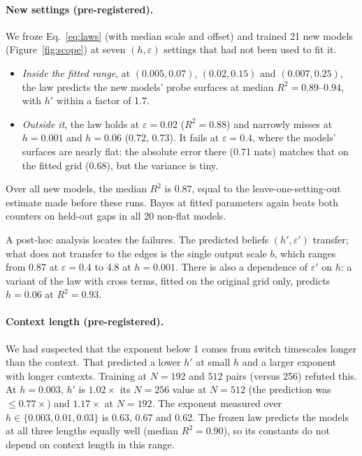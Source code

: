 \documentclass[11pt]{article}
\newcommand{\hp}{h'}
\newcommand{\ep}{\varepsilon'}
\begin{document}
\paragraph{New settings (pre-registered).} We froze Eq.~\eqref{eq:laws} (with median scale and offset) and trained 21 new models (Figure~\ref{fig:scope}) at seven $(h,\varepsilon)$ settings that had not been used to fit it.
\begin{itemize}
\item \emph{Inside the fitted range}, at $(0.005, 0.07)$, $(0.02, 0.15)$ and $(0.007, 0.25)$, the law predicts the new models' probe surfaces at median $R^2 = 0.89$--$0.94$, with $\hp$ within a factor of 1.7.
\item \emph{Outside it}, the law holds at $\varepsilon = 0.02$ ($R^2 = 0.88$) and narrowly misses at $h = 0.001$ and $h = 0.06$ (0.72, 0.73). It fails at $\varepsilon = 0.4$, where the models' surfaces are nearly flat: the absolute error there (0.71 nats) matches that on the fitted grid (0.68), but the variance is tiny.
\end{itemize}
Over all new models, the median $R^2$ is 0.87, equal to the leave-one-setting-out estimate made before these runs. Bayes at fitted parameters again beats both counters on held-out gaps in all 20 non-flat models.

A post-hoc analysis locates the failures. The predicted beliefs $(\hp, \ep)$ transfer; what does not transfer to the edges is the single output scale $b$, which ranges from 0.87 at $\varepsilon = 0.4$ to 4.8 at $h = 0.001$. There is also a dependence of $\ep$ on $h$: a variant of the law with cross terms, fitted on the original grid only, predicts $h = 0.06$ at $R^2 = 0.93$.

\paragraph{Context length (pre-registered).} We had suspected that the exponent below 1 comes from switch timescales longer than the context. That predicted a lower $\hp$ at small $h$ and a larger exponent with longer contexts. Training at $N = 192$ and $512$ pairs (versus 256) refuted this. At $h = 0.003$, $\hp$ is $1.02\times$ its $N = 256$ value at $N = 512$ (the prediction was $\le 0.77\times$) and $1.17\times$ at $N = 192$. The exponent measured over $h \in \{0.003, 0.01, 0.03\}$ is 0.63, 0.67 and 0.62. The frozen law predicts the models at all three lengths equally well (median $R^2 = 0.90$), so its constants do not depend on context length in this range.
\end{document}
